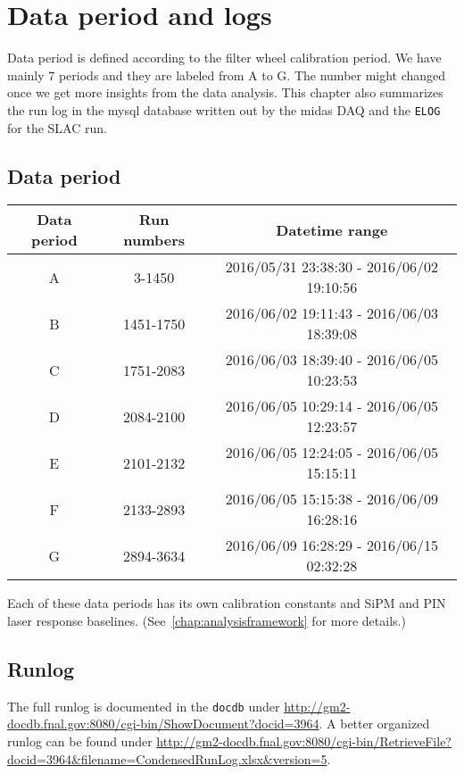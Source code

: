 \chapter{Data period and logs}
\label{chap:runlog}

Data period is defined according to the filter wheel calibration period. We have mainly 7 periods and they are labeled from A to G.  The number might changed once we get more insights from the data analysis. This chapter also summarizes the run log in the mysql database written out by the \ac{midas} DAQ and the \verb+ELOG+ for the SLAC run.

\section{Data period}

\begin{table}[htbp]
\caption{Summary of the data period. Included are the range of the run numbers and the date-time.}
\begin{longtable}{|c|c|c|} \hline
Data period &  Run numbers & Datetime range \\ \hline
A & 3-1450 & 2016/05/31 23:38:30 - 2016/06/02 19:10:56 \\ \hline
B & 1451-1750 & 2016/06/02 19:11:43  - 2016/06/03 18:39:08 \\ \hline
C & 1751-2083 & 2016/06/03 18:39:40 - 2016/06/05 10:23:53 \\ \hline
D & 2084-2100 & 2016/06/05 10:29:14 - 2016/06/05 12:23:57 \\ \hline
E & 2101-2132 & 2016/06/05 12:24:05 - 2016/06/05 15:15:11 \\ \hline
F & 2133-2893 & 2016/06/05 15:15:38 - 2016/06/09 16:28:16 \\ \hline
G & 2894-3634 & 2016/06/09 16:28:29 - 2016/06/15 02:32:28 \\ \hline
\end{longtable}
\end{table}

Each of these data periods has its own calibration constants and SiPM and PIN laser response baselines.
(See~\cref{chap:analysisframework} for more details.)

\section{Runlog}

The full runlog is documented in the \verb+docdb+ under \url{http://gm2-docdb.fnal.gov:8080/cgi-bin/ShowDocument?docid=3964}.
A better organized runlog can be found under \url{http://gm2-docdb.fnal.gov:8080/cgi-bin/RetrieveFile?docid=3964&filename=CondensedRunLog.xlsx&version=5}.

